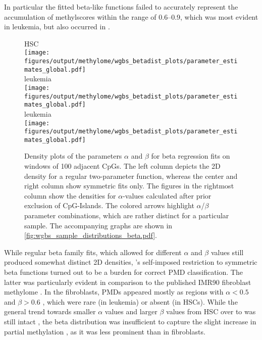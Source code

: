 In particular the fitted beta-like functions failed to accurately represent the accumulation of methylscores within the range of \numrange{0.6}{0.9}, which was most evident in \dnmtwt \kitpos leukemia, but also occurred in \dnmtchip {}.

\begin{figure}[!ht]
	\centering \dnmtwt HSC 	\vspace{0.05em} \\
	\texttt{[image: figures/output/methylome/wgbs\_betadist\_plots/parameter\_estimates\_global.pdf]} 	
	\vspace{0.1em}\\ \dnmtwt \kitpos leukemia \vspace{0.05em} \\
	\texttt{[image: figures/output/methylome/wgbs\_betadist\_plots/parameter\_estimates\_global.pdf]} 
	\vspace{0.1em}\\ \dnmtchip \kitpos leukemia \vspace{0.05em} \\
	\texttt{[image: figures/output/methylome/wgbs\_betadist\_plots/parameter\_estimates\_global.pdf]}
	\caption{Density plots of the parameters $\alpha$ and $\beta$ for beta regression fits on windows of \num{100} adjacent CpGs. The left column depicts the 2D density for a regular two-parameter function, whereas the center and right column show symmetric fits only. The figures in the rightmost column show the densities for $\alpha$-values calculated after prior exclusion of CpG-Islands. The colored arrows highlight $\alpha$/$\beta$ parameter combinations, which are rather distinct for a particular sample. The accompanying graphs are shown in \autoref{fig:wgbs_sample_distributions_beta.pdf}.}
	\label{fig:wgbs_betadist_parameter_estimates_global.pdf}
\end{figure}
\clearpage

While regular beta family fits, which allowed for different $\alpha$ and $\beta$ values still produced somewhat distinct 2D densities, 's self-imposed restriction to symmetric beta functions turned out to be a burden for correct PMD classification. The latter was particularly evident in comparison to the published IMR90 fibroblast methylome . 
In the fibroblasts, PMDs appeared mostly as regions with $\alpha < 0.5$ and $\beta > 0.6$ , which were rare (in leukemia) or absent (in HSCs). While the general trend towards smaller $\alpha$ values and larger $\beta$ values from \dnmtwt HSC over \dnmtwt \kitpos to \dnmtchip \kitpos was still intact , the beta distribution was insufficient to capture the slight increase in partial methylation , as it was less prominent than in fibroblasts. 	 

